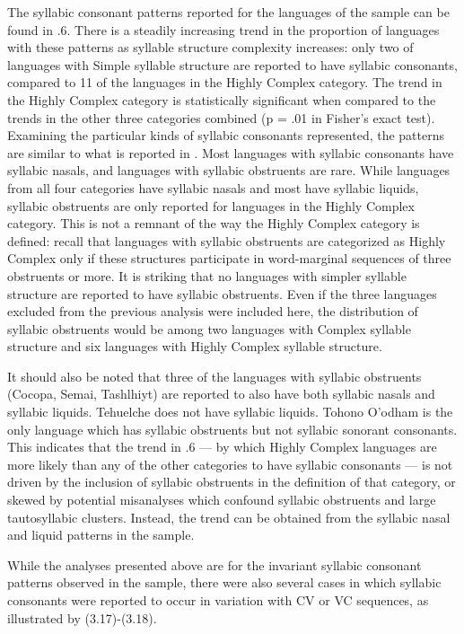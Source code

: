   The syllabic consonant patterns reported for the languages of the sample can be found in .6. There is a steadily increasing trend in the proportion of languages with these patterns as syllable structure complexity increases: only two of languages with Simple syllable structure are reported to have syllabic consonants, compared to 11 of the languages in the Highly Complex category. The trend in the Highly Complex category is statistically significant when compared to the trends in the other three categories combined (p = .01 in Fisher’s exact test). Examining the particular kinds of syllabic consonants represented, the patterns are similar to what is reported in \citet{Bell1978a}. Most languages with syllabic consonants have syllabic nasals, and languages with syllabic obstruents are rare. While languages from all four categories have syllabic nasals and most have syllabic liquids, syllabic obstruents are only reported for languages in the Highly Complex category. This is not a remnant of the way the Highly Complex category is defined: recall that languages with syllabic obstruents are categorized as Highly Complex only if these structures participate in word-marginal sequences of three obstruents or more. It is striking that no languages with simpler syllable structure are reported to have syllabic obstruents. Even if the three languages excluded from the previous analysis were included here, the distribution of syllabic obstruents would be among two languages with Complex syllable structure and six languages with Highly Complex syllable structure. 

  It should also be noted that three of the languages with syllabic obstruents (Cocopa, Semai, Tashlhiyt) are reported to also have both syllabic nasals and syllabic liquids. Tehuelche does not have syllabic liquids. Tohono O’odham is the only language which has syllabic obstruents but not syllabic sonorant consonants. This indicates that the trend in .6 — by which Highly Complex languages are more likely than any of the other categories to have syllabic consonants  — is not driven by the inclusion of syllabic obstruents in the definition of that category, or skewed by potential misanalyses which confound syllabic obstruents and large tautosyllabic clusters. Instead, the trend can be obtained from the syllabic nasal and liquid patterns in the sample.

  While the analyses presented above are for the invariant syllabic consonant patterns observed in the sample, there were also several cases in which syllabic consonants were reported to occur in variation with CV or VC sequences, as illustrated by (3.17)-(3.18).

